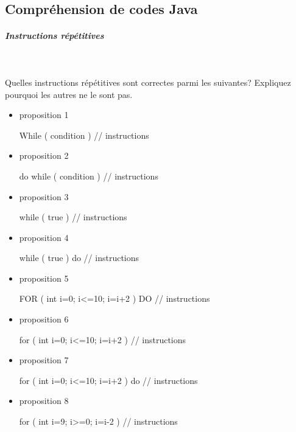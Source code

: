 \documentclass[11pt,a4paper]{article}
\begin{document}
            \par
        \subsection{Compr\'ehension de codes Java}
			
		\subparagraph{Instructions r\'ep\'etitives} 
		
                \textcolor{white}{.} \par
            
							Quelles instructions r\'ep\'etitives sont correctes parmi les suivantes? 
							Expliquez pourquoi les autres ne le sont pas.
						
            \begin{itemize} 
        
            \item[ \ding{"6F} ] proposition 1
							\begin{Java}
While ( condition ) {
	// instructions
}							\end{Java}
        
            \item[ \ding{"6F} ] proposition 2
							\begin{Java}
do while ( condition ) {
	// instructions
}							\end{Java}
        
            \item[ \ding{"6F} ] proposition 3
							\begin{Java}
while ( true ) {
	// instructions
}							\end{Java}
        
            \item[ \ding{"6F} ] proposition 4
							\begin{Java}
while ( true ) do {
	// instructions
}							\end{Java}
        
            \item[ \ding{"6F} ] proposition 5
							\begin{Java}
FOR ( int i=0; i<=10; i=i+2 ) DO {
	// instructions
}							\end{Java}
        
            \item[ \ding{"6F} ] proposition 6
							\begin{Java}
for ( int i=0; i<=10; i=i+2 ) {
	// instructions
}							\end{Java}
        
            \item[ \ding{"6F} ] proposition 7
							\begin{Java}
for ( int i=0; i<=10; i=i+2 ) do {
	// instructions
}							\end{Java}
        
            \item[ \ding{"6F} ] proposition 8
							\begin{Java}
for ( int i=9; i>=0; i=i-2 ) {
	// instructions
}							\end{Java}
        
            \end{itemize} 
        
\end{document}
